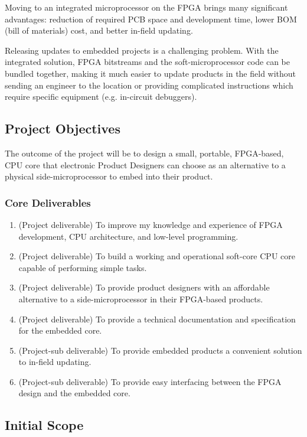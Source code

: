 Moving to an integrated microprocessor on the FPGA brings many significant advantages: reduction of required PCB space and development time, lower BOM (bill of materials) cost, and better in-field updating.

Releasing updates to embedded projects is a challenging problem. With the integrated solution, FPGA bitstreams and the soft-microprocessor code can be bundled together, making it much easier to update products in the field without sending an engineer to the location or providing complicated instructions which require specific equipment (e.g. in-circuit debuggers).

\newpage
\subsection*{Project Objectives}
The outcome of the project will be to design a small, portable, FPGA-based, CPU core that electronic Product Designers can choose as an alternative to a physical side-microprocessor to embed into their product.

\subsubsection*{Core Deliverables}
\begin{enumerate}[label=\bfseries P\arabic*.]
\item{(Project deliverable) To improve my knowledge and experience of FPGA  development, CPU architecture, and low-level programming.}
\item{(Project deliverable) To build a working and operational soft-core CPU core capable of performing simple tasks.}
\item{(Project deliverable) To provide product designers with an affordable alternative to a side-microprocessor in their FPGA-based products.}
\item{(Project deliverable) To provide a technical documentation and specification for the embedded core.}
\item{(Project-sub deliverable) To provide embedded products a convenient solution to in-field updating.}
\item{(Project-sub deliverable) To provide easy interfacing between the FPGA design and the embedded core.}  
\end{enumerate}

\subsection*{Initial Scope}
